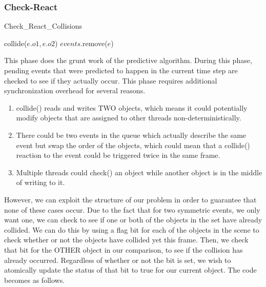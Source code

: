 \documentclass[CEJCS,PDF]{cej} %
\begin{document}
\subsubsection{Check-React}
\label{sub:checkreact}
\begin{algorithm}
\caption{Check\_React\_Collisions}
\begin{algorithmic}
\STATE {}
	\STATE {}
		\STATE {}
		\STATE collide($e.o1,e.o2$)
	\ENDIF
	\STATE {}
	\STATE $events$.remove($e$)
\ENDFOR
\end{algorithmic}
\end{algorithm}
This phase does the grunt work of the predictive algorithm.  During this phase, pending events that were predicted to happen in the current time step are checked to see if they actually occur.  This phase requires additional synchronization overhead for several reasons.

\begin{enumerate}
	\item collide() reads and writes TWO objects, which means it could potentially modify objects that are assigned to other threads non-deterministically.
	\item There could be two events in the queue which actually describe the same event but swap the order of the objects, which could mean that a collide() reaction to the event could be triggered twice in the same frame.
	\item Multiple threads could check() an object while another object is in the middle of writing to it.
\end{enumerate}

However, we can exploit the structure of our problem in order to guarantee that none of these cases occur.  Due to the fact that for two symmetric events, we only want one, we can check to see if one or both of the objects in the set have already collided.
We can do this by using a flag bit for each of the objects in the scene to check whether or not the objects have collided yet this frame.  Then, we check
that bit for the OTHER object in our comparison, to see if the collision has already occurred.  Regardless of whether or not the bit is set, we wish to atomically
update the status of that bit to true for our current object.  The code becomes as follows.
\end{document}
